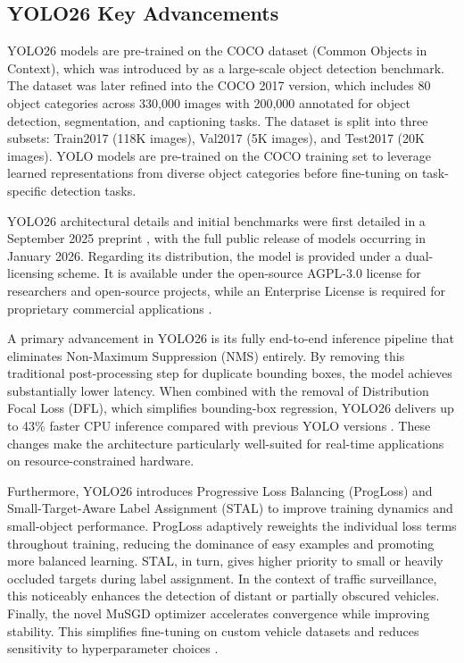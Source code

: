 \subsection{YOLO26 Key Advancements}
\label{sec:yolo26-advancements}

YOLO26 models are pre-trained on the COCO dataset (Common Objects in Context), which was introduced by \cite{COCO_dataset} as a large-scale object detection benchmark. The dataset was later refined into the COCO 2017 version, which includes 80 object categories across 330,000 images with 200,000 annotated for object detection, segmentation, and captioning tasks. The dataset is split into three subsets: Train2017 (118K images), Val2017 (5K images), and Test2017 (20K images)\citep{ultralytics2024coco}. YOLO models are pre-trained on the COCO training set to leverage learned representations from diverse object categories before fine-tuning on task-specific detection tasks.

YOLO26 architectural details and initial benchmarks were first detailed in a September 2025 preprint \citep{sapkota2026yolo26keyarchitecturalenhancements}, with the full public release of models occurring in January 2026. Regarding its distribution, the model is provided under a dual-licensing scheme. It is available under the open-source AGPL-3.0 license for researchers and open-source projects, while an Enterprise License is required for proprietary commercial applications \citep{Ultralytics2024}.

A primary advancement in YOLO26 is its fully end-to-end inference pipeline that eliminates Non-Maximum Suppression (NMS) entirely. By removing this traditional post-processing step for duplicate bounding boxes, the model achieves substantially lower latency. When combined with the removal of Distribution Focal Loss (DFL), which simplifies bounding-box regression, YOLO26 delivers up to 43\% faster CPU inference compared with previous YOLO versions \citep{sapkota2026yolo26keyarchitecturalenhancements}. These changes make the architecture particularly well-suited for real-time applications on resource-constrained hardware.

Furthermore, YOLO26 introduces Progressive Loss Balancing (ProgLoss) and Small-Target-Aware Label Assignment (STAL) to improve training dynamics and small-object performance. ProgLoss adaptively reweights the individual loss terms throughout training, reducing the dominance of easy examples and promoting more balanced learning. STAL, in turn, gives higher priority to small or heavily occluded targets during label assignment. In the context of traffic surveillance, this noticeably enhances the detection of distant or partially obscured vehicles. Finally, the novel MuSGD optimizer accelerates convergence while improving stability. This simplifies fine-tuning on custom vehicle datasets and reduces sensitivity to hyperparameter choices \citep{sapkota2026yolo26keyarchitecturalenhancements}.


